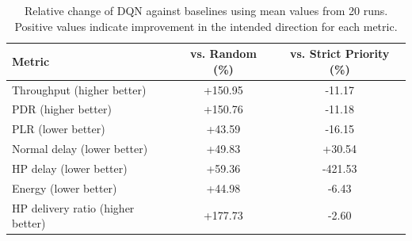 \begin{table}[t]
\centering
\caption{Relative change of DQN against baselines using mean values from 20 runs. Positive values indicate improvement in the intended direction for each metric.}
\label{tab:relative_gain}
\scriptsize
\begin{tabular}{lcc}
\toprule
Metric & vs. Random (\%) & vs. Strict Priority (\%) \\
\midrule
Throughput (higher better) & +150.95 & -11.17 \\
PDR (higher better) & +150.76 & -11.18 \\
PLR (lower better) & +43.59 & -16.15 \\
Normal delay (lower better) & +49.83 & +30.54 \\
HP delay (lower better) & +59.36 & -421.53 \\
Energy (lower better) & +44.98 & -6.43 \\
HP delivery ratio (higher better) & +177.73 & -2.60 \\
\bottomrule
\end{tabular}
\end{table}
